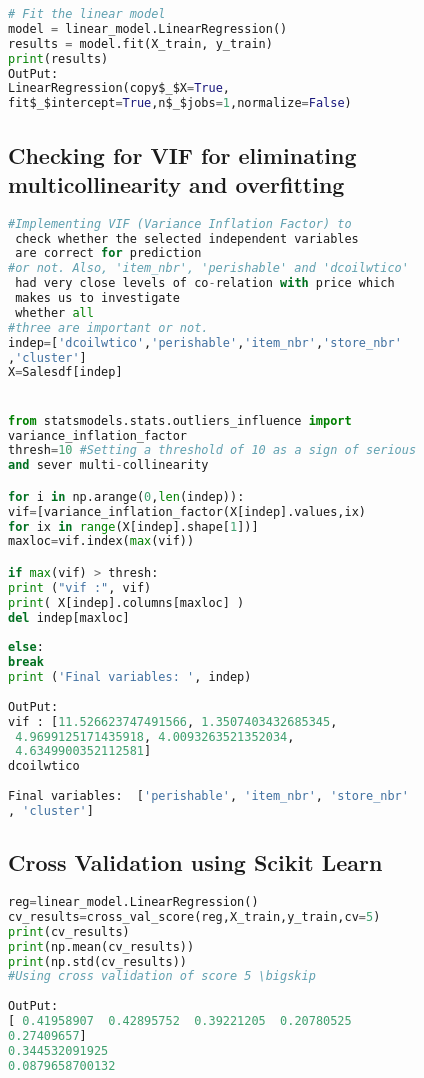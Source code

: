 \begin{lstlisting}[language=Python]
# Fit the linear model
model = linear_model.LinearRegression()
results = model.fit(X_train, y_train)
print(results)
OutPut: 
LinearRegression(copy$_$X=True, 
fit$_$intercept=True,n$_$jobs=1,normalize=False)

\end{lstlisting}

	\subsection{Checking for VIF for eliminating multicollinearity and overfitting}
	
	\begin{lstlisting}[language=Python]
#Implementing VIF (Variance Inflation Factor) to 
 check whether the selected independent variables 
 are correct for prediction 
#or not. Also, 'item_nbr', 'perishable' and 'dcoilwtico'
 had very close levels of co-relation with price which 
 makes us to investigate
 whether all 
#three are important or not.
indep=['dcoilwtico','perishable','item_nbr','store_nbr'
,'cluster']
X=Salesdf[indep] 


from statsmodels.stats.outliers_influence import 
variance_inflation_factor  
thresh=10 #Setting a threshold of 10 as a sign of serious 
and sever multi-collinearity

for i in np.arange(0,len(indep)):
vif=[variance_inflation_factor(X[indep].values,ix)
for ix in range(X[indep].shape[1])]
maxloc=vif.index(max(vif))

if max(vif) > thresh:
print ("vif :", vif)
print( X[indep].columns[maxloc] )
del indep[maxloc]
	
else:
break
print ('Final variables: ', indep) 
	
OutPut:
vif : [11.526623747491566, 1.3507403432685345, 
 4.9699125171435918, 4.0093263521352034, 
 4.6349900352112581]
dcoilwtico
		
Final variables:  ['perishable', 'item_nbr', 'store_nbr'
, 'cluster']
	\end{lstlisting}

	\subsection{Cross Validation using Scikit Learn}
	\begin{lstlisting}[language=Python]
reg=linear_model.LinearRegression()
cv_results=cross_val_score(reg,X_train,y_train,cv=5)
print(cv_results)
print(np.mean(cv_results))
print(np.std(cv_results))
#Using cross validation of score 5 \bigskip
	
OutPut:
[ 0.41958907  0.42895752  0.39221205  0.20780525  
0.27409657]
0.344532091925
0.0879658700132
	\end{lstlisting}

